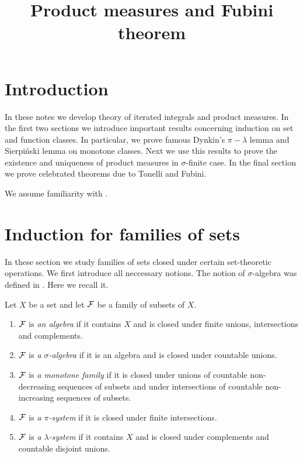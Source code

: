 



\title{Product measures and Fubini theorem}
\date{}
\maketitle

\section{Introduction}
\noindent
In these notes we develop theory of iterated integrals and product measures. In the first two sections we introduce important results concerning induction on set and function classes. In particular, we prove famous Dynkin's $\pi-\lambda$ lemma and Sierpiński lemma on monotone classes. Next we use this results to prove the existence and uniqueness of product measures in $\sigma$-finite case. In the final section we prove celebrated theorems due to Tonelli and Fubini.

We assume familiarity with \cite{Integration}.

\section{Induction for families of sets}
\noindent
In these section we study families of sets closed under certain set-theoretic operations. We first introduce all neccessary notions. The notion of $\sigma$-algebra was defined in \cite{Integration}. Here we recall it.

\begin{definition}\label{definition:families_of_sets}
    Let $X$ be a set and let ${\mathcal F}$ be a family of subsets of $X$.
    \begin{enumerate}[label=\textbf{(\arabic*)}, leftmargin=*]
        \item ${\mathcal F}$ is \textit{an algebra} if it contains $X$ and is closed under finite unions, intersections and complements.
        \item ${\mathcal F}$ is \textit{a $\sigma$-algebra} if it is an algebra and is closed under countable unions.
        \item ${\mathcal F}$ is \textit{a monotone family} if it is closed under unions of countable non-decreasing sequences of subsets and under intersections of countable non-increasing sequences of subsets.
        \item ${\mathcal F}$ is \textit{a $\pi$-system} if it is closed under finite intersections.
        \item ${\mathcal F}$ is \textit{a $\lambda$-system} if it contains $X$ and is closed under complements and countable disjoint unions.
    \end{enumerate}
\end{definition}


